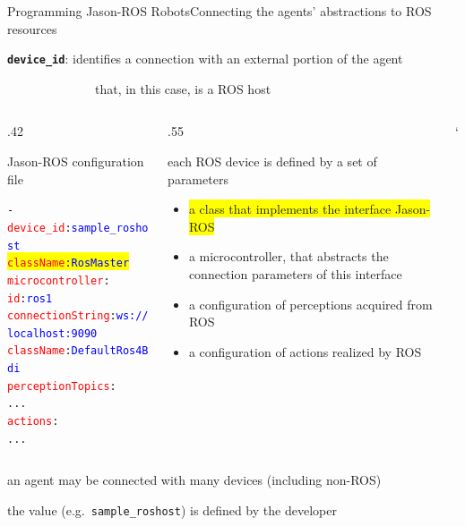 \documentclass[compress]{beamer}
\newcommand{\yamlkey}[1]{\textcolor{red}{\texttt{#1}}}
\newcommand{\yamlvalue}[1]{\textcolor{blue}{\texttt{#1}}}
\begin{document}
\begin{frame}[fragile]{Programming Jason-ROS Robots}{Connecting the agents' abstractions to ROS resources}

    \footnotesize
    \texttt{{\bf device\_id}}: identifies a connection with an external portion of the agent\\ 
    
    \vspace{-.5cm}
    
    \ \ \ \ \ \ \ \ \ \ \ \ \ \ {\tiny that, in this case, is a ROS host}

    
    \begin{columns}
       \begin{column}{.42\textwidth}      
            \begin{block}{{\scriptsize Jason-ROS configuration file}}
                \scriptsize
                \begin{alltt} \tiny
- \yamlkey{device\_id}: \yamlvalue{sample\_roshost}
 \colorbox{yellow}{\yamlkey{className}: \yamlvalue{RosMaster}}
  \yamlkey{microcontroller}: 
    \yamlkey{id}: \yamlvalue{ros1} 
    \yamlkey{connectionString}: \yamlvalue{ws://localhost:9090} 
    \yamlkey{className}: \yamlvalue{DefaultRos4Bdi}
  \yamlkey{perceptionTopics}:         
    ...
  \yamlkey{actions}:       
    ...
                \end{alltt}

            \end{block}    
        \end{column}
        
        \hspace{-25pt} %
  
        \begin{column}{.55\textwidth} \scriptsize
  
            each ROS device is defined by a set of parameters
            \begin{itemize}\tiny
                \item\colorbox{yellow}{a class that implements the interface Jason-ROS}
                \item a microcontroller, that abstracts the connection parameters of this interface
                \item a configuration of perceptions acquired from ROS
                \item a configuration of actions realized by ROS
            \end{itemize}
        \end{column}`      
    \end{columns}
  
  
    \vspace{.3cm}
  
    an agent may be connected with many devices {\tiny (including non-ROS)}\\ \vspace{-.2cm}
  
    the value (e.g.~\texttt{sample\_roshost}) is defined by the developer
    
\end{frame}
\end{document}
